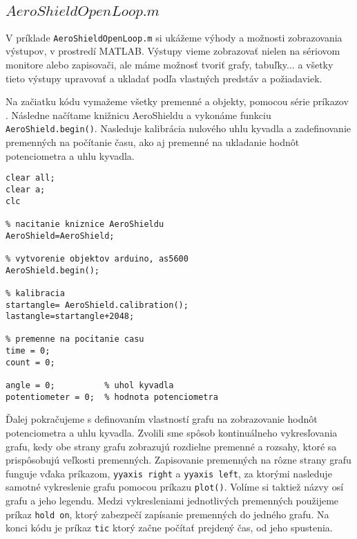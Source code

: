 \subsection{$AeroShieldOpenLoop.m$}

V príklade \verb|AeroShieldOpenLoop.m| si ukážeme výhody a možnosti zobrazovania výstupov, v prostredí MATLAB. Výstupy vieme zobrazovať nielen na sériovom monitore alebo zapisovači, ale máme možnosť tvoriť grafy, tabuľky... a všetky tieto výstupy upravovať a ukladať podľa vlastných predstáv a požiadaviek. 


Na začiatku kódu vymažeme všetky premenné a objekty, pomocou série príkazov . Následne načítame knižnicu AeroShieldu a vykonáme funkciu \verb|AeroShield.begin()|. Nasleduje kalibrácia nulového uhlu kyvadla a zadefinovanie premenných na počítanie času, ako aj premenné na ukladanie hodnôt potenciometra a uhlu kyvadla. 

\begin{lstlisting}[caption={AeroShield open loop inicializacia.},captionpos=b]
% vymazanie premennych a objektov 
clear all;
clear a;
clc 

% nacitanie kniznice AeroShieldu  
AeroShield=AeroShield;

% vytvorenie objektov arduino, as5600
AeroShield.begin();

% kalibracia
startangle= AeroShield.calibration(); 
lastangle=startangle+2048; 

% premenne na pocitanie casu
time = 0;
count = 0;

angle = 0;          % uhol kyvadla
potentiometer = 0;  % hodnota potenciometra
\end{lstlisting}

Ďalej pokračujeme s definovaním vlastností grafu na zobrazovanie hodnôt potenciometra a uhlu kyvadla. Zvolili sme spôsob kontinuálneho vykresľovania grafu, kedy obe strany grafu zobrazujú rozdielne premenné a rozsahy, ktoré sa prispôsobujú veľkosti premenných. Zapisovanie premenných na rôzne strany grafu funguje vďaka príkazom, \verb|yyaxis right| a \verb|yyaxis left|, za ktorými nasleduje samotné vykreslenie grafu pomocou príkazu \verb|plot()|. Volíme si taktiež názvy osí grafu a jeho legendu. Medzi vykresleniami jednotlivých premenných použijeme príkaz \verb|hold on|, ktorý zabezpečí zapísanie premenných do jedného grafu. Na konci kódu je príkaz \verb|tic| ktorý začne počítať prejdený čas, od jeho spustenia. 

